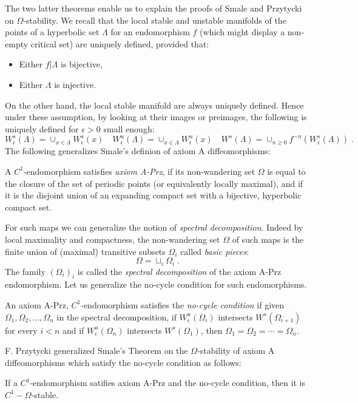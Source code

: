 \documentclass[11pt,openany,leqno]{article}
\begin{document}
The two latter theorems enable us to explain the proofs of  Smale and Przytycki on {$\Omega$-stability}. We recall that the local stable and unstable manifolds of the points of a hyperbolic set $\Lambda$ for an endomorphism $f$ (which might display a non-empty critical set) are uniquely defined, provided that:
\begin{itemize}
\item Either $f|\Lambda$ is bijective,
\item Either  $\Lambda$ is injective.
\end{itemize}
On the other hand, the local stable manifold are always uniquely defined. Hence under these assumption, by looking at their images or preimages, the following is uniquely defined for $\epsilon>0$ small enough:
\[ W^s_\epsilon (\Lambda) = \cup_{x\in \Lambda} W^s_\epsilon (x)\quad 
W^u_\epsilon (\Lambda) = \cup_{x\in \Lambda} W^u_\epsilon (x)
\quad 
W^s (\Lambda) = \cup_{n\ge 0} f^{-n} (W^s_\epsilon (\Lambda))
\; .\]
The following generalizes Smale's definion of axiom A diffeomorphisms:
\begin{defi}
A $C^1$-endomorphism satisfies \emph{axiom A-Prz}, if  its non-wandering set $\Omega$ is equal to the closure of the set of periodic points (or equivalently locally maximal), and if it is the disjoint union of an expanding compact set with a bijective, hyperbolic compact set. 
\end{defi}
For such maps we can generalize the notion of \emph{spectral decomposition}. Indeed 
by local maximality and compactness, the non-wandering set $\Omega$ of such maps is the finite union of (maximal) transitive subsets $\Omega_i$ called \emph{basic pieces}:
\[\Omega= \sqcup_i \Omega_i\; .\]
The family  $(\Omega_i)_i$ is called the \emph{spectral decomposition} of the axiom A-Prz endomorphism. Let us generalize the  no-cycle condition for such endomorphisms. 
 \begin{defi}
An axiom A-Prz,  $C^1$-endomorphism satisfies the \emph{no-cycle condition} if given $\Omega_1,\Omega_2, \dots, \Omega_n$ in the spectral decomposition, if $W^u_\epsilon(\Omega_i)$ intersects $W^s(\Omega_{i+1})$ for every $i<n$ and if 
$W^u_\epsilon(\Omega_n)$ intersects $W^s(\Omega_{1})$, then $\Omega_1=\Omega_2= \cdots = \Omega_n$.
\end{defi}
F. Przytycki  generalized Smale's Theorem on the $\Omega$-stability of axiom A diffeomorphisms which satisfy the no-cycle condition as follows:
\begin{thm}
If a $C^1$-endomorphism satifies axiom A-Prz and the no-cycle condition, then it is $C^1-\Omega$-stable.
\end{thm}
\end{document}

